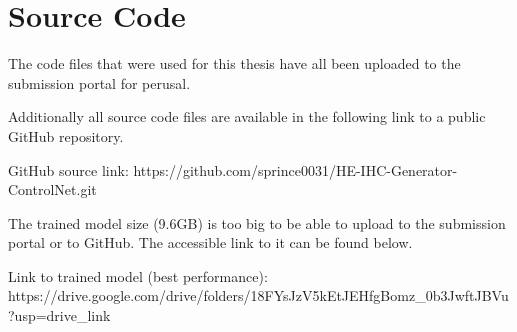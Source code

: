 \documentclass[oneside,12pt]{Latex/Classes/PhDthesisPSnPDF}
\begin{document}
	

% 			

	
 


\appendix
\chapter{Source Code}

The code files that were used for this thesis have all been uploaded to the submission portal for perusal.

Additionally all source code files are available in the following link to a public GitHub repository.

GitHub source link: https://github.com/sprince0031/HE-IHC-Generator-ControlNet.git

The trained model size (9.6GB) is too big to be able to upload to the submission portal or to GitHub. The accessible link to it can be found below.

Link to trained model (best performance): https://drive.google.com/drive/folders/18FYsJzV5kEtJEHfgBomz_0b3JwftJBVu?usp=drive_link 











\printbibliography[
heading=bibintoc,
title={References}
]



\end{document}
